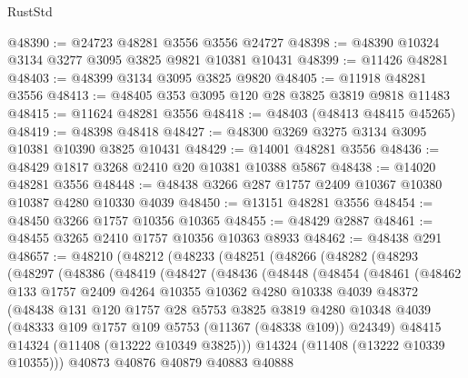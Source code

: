 \begin{lexlean}{RustStd}
\begin{coremodule}
@48390 := @24723 @48281 @3556 @3556 @24727
@48398 := @48390 @10324 @3134 @3277 @3095 @3825 @9821 @10381 @10431
@48399 := @11426 @48281
@48403 := @48399 @3134 @3095 @3825 @9820
@48405 := @11918 @48281 @3556
@48413 := @48405 @353 @3095 @120 @28 @3825 @3819 @9818 @11483
@48415 := @11624 @48281 @3556
@48418 := @48403 (@48413 @48415 @45265)
@48419 := @48398 @48418
@48427 := @48300 @3269 @3275 @3134 @3095 @10381 @10390 @3825 @10431
@48429 := @14001 @48281 @3556
@48436 := @48429 @1817 @3268 @2410 @20 @10381 @10388 @5867
@48438 := @14020 @48281 @3556
@48448 := @48438 @3266 @287 @1757 @2409 @10367 @10380 @10387 @4280 @10330 @4039
@48450 := @13151 @48281 @3556
@48454 := @48450 @3266 @1757 @10356 @10365
@48455 := @48429 @2887
@48461 := @48455 @3265 @2410 @1757 @10356 @10363 @8933
@48462 := @48438 @291
@48657 := @48210
    (@48212
      (@48233
        (@48251
          (@48266
            (@48282
              (@48293
                (@48297
                  (@48386
                    (@48419
                      (@48427
                        (@48436
                          (@48448
                            (@48454
                              (@48461
                                (@48462
                                  @133
                                  @1757
                                  @2409
                                  @4264
                                  @10355
                                  @10362
                                  @4280
                                  @10338
                                  @4039
                                  @48372
                                  (@48438
                                    @131
                                    @120
                                    @1757
                                    @28
                                    @5753
                                    @3825
                                    @3819
                                    @4280
                                    @10348
                                    @4039
                                    (@48333 @109 @1757 @109 @5753 (@11367 (@48338 @109)) @24349)
                                    @48415
                                    @14324
                                    (@11408 (@13222 @10349 @3825)))
                                  @14324
                                  (@11408 (@13222 @10339 @10355)))
                                @40873
                                @40876
                                @40879
                                @40883
                                @40888

\end{coremodule}
\end{lexlean}
